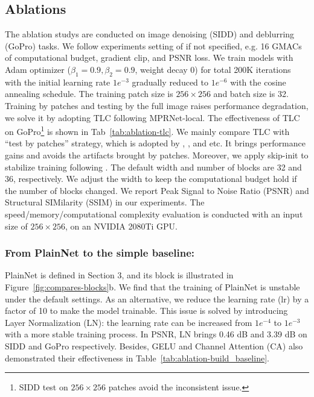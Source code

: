 \documentclass[runningheads]{llncs}
\begin{document}
\subsection{Ablations}
The ablation studys are conducted on image denoising (SIDD\cite{SIDD_2018_CVPR}) and deblurring (GoPro\cite{nah2017deep}) tasks. 
 We follow experiments setting of \cite{chen2021hinet} if not specified, e.g. 16 GMACs of computational budget, gradient clip, and PSNR loss.
We train models with Adam\cite{kingma2014adam} optimizer ($\beta_1=0.9, \beta_2=0.9$, weight decay 0) for total 200K iterations with the initial learning rate $1e^{-3}$ gradually reduced to $1e^{-6}$ with the cosine annealing schedule\cite{loshchilov2016sgdr}. The training patch size is $256\times 256$ and batch size is 32. Training by patches and testing by the full image raises performance degradation\cite{chu2021revisiting}, we solve it by adopting TLC\cite{chu2021revisiting} following MPRNet-local\cite{chu2021revisiting}. 
The effectiveness of TLC on GoPro\footnote{SIDD test on $256\times256$ patches avoid the inconsistent issue.} is shown in Tab~\ref{tab:ablation-tlc}. We mainly compare TLC with ``test by patches'' strategy, which is adopted by \cite{chen2021hinet}, \cite{mao2021deep}, and etc. It brings performance gains and avoids the artifacts brought by patches.
Moreover,  we apply skip-init\cite{de2020batch} to stabilize training following \cite{liu2022convnet}. The default width and number of blocks are 32 and 36, respectively. We adjust the width to keep the computational budget hold if the number of blocks changed. 
We report Peak Signal to Noise Ratio (PSNR) and Structural SIMilarity (SSIM) in our experiments. The speed/memory/computational complexity evaluation is conducted with an input size of $256\times 256$, on an NVIDIA 2080Ti GPU. 




\subsubsection{From PlainNet to the simple baseline:} PlainNet is defined in Section 3, and its block is illustrated in Figure~\ref{fig:compares-blocks}b. We find that the training of PlainNet is unstable under the default settings. As an alternative, we reduce the learning rate (lr) by a factor of 10 to make the model trainable. This issue is solved by introducing Layer Normalization (LN): the learning rate can be increased from $1e^{-4}$ to $1e^{-3}$ with a more stable training process. In PSNR, LN brings 0.46 dB and 3.39 dB on SIDD and GoPro respectively. Besides, GELU and Channel Attention (CA) also demonstrated their effectiveness in Table~\ref{tab:ablation-build_baseline}. 
\end{document}
